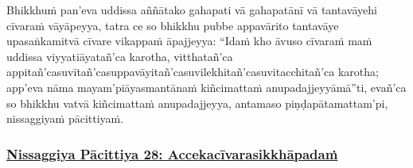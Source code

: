 {
Bhikkhuṁ pan'eva uddissa aññātako gahapati vā gahapatānī vā tantavāyehi cīvaraṁ vāyāpeyya, tatra ce so bhikkhu pubbe appavārito tantavāye upasaṅkamitvā cīvare vikappaṁ āpajjeyya: ``Idaṁ kho āvuso cīvaraṁ maṁ uddissa viyyati\makeatletter\hyperlink{endnote209-appendix}\makeatother \thinspace āyatañ'ca karotha, vitthatañ'ca appitañ'ca\makeatletter\hyperlink{endnote210-appendix}\makeatother \thinspace suvītañ'ca\makeatletter\hyperlink{endnote211-appendix}\makeatother \thinspace suppavāyitañ'ca\makeatletter\hyperlink{endnote212-appendix}\makeatother \thinspace suvilekhitañ'ca\makeatletter\hyperlink{endnote213-appendix}\makeatother \thinspace suvitacchitañ'ca karotha; app'eva nāma mayam'pi\makeatletter\hyperlink{endnote214-appendix}\makeatother \thinspace āyasmantānaṁ kiñcimattaṁ anupadajjeyyāmā''ti, evañ'ca so bhikkhu vatvā kiñcimattaṁ anupadajjeyya, antamaso piṇḍapātamattam'pi, nissaggiyaṁ pācittiyaṁ.



\subsubsection*{\hyperref[forf-exp28]{Nissaggiya Pācittiya 28: Accekacīvarasikkhāpadaṁ}}
\label{np28}

}

